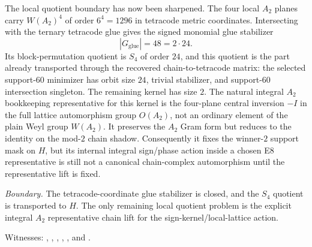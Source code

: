 %

\begin{result}
The local quotient boundary has now been sharpened.  The four local $A_2$ planes carry
$W(A_2)^4$ of order $6^4=1296$ in tetracode metric coordinates.  Intersecting with the
ternary tetracode glue gives the signed monomial glue stabilizer
\[
  |G_{\mathrm{glue}}|=48=2\cdot24.
\]
Its block-permutation quotient is $S_4$ of order $24$, and this quotient is the part already
transported through the recovered chain-to-tetracode matrix: the selected support-$60$ minimizer has
orbit size $24$, trivial stabilizer, and support-$60$ intersection singleton.  The remaining kernel has
size $2$.  The natural integral $A_2$ bookkeeping representative for this kernel is the four-plane
central inversion $-I$ in the full lattice automorphism group $O(A_2)$, not an ordinary element of the
plain Weyl group $W(A_2)$.  It preserves the $A_2$ Gram form but reduces to the identity on the mod-$2$
chain shadow.  Consequently it fixes the winner-$2$ support mask on $H$, but its internal integral
sign/phase action inside a chosen E8 representative is still not a canonical chain-complex automorphism
until the representative lift is fixed.

\emph{Boundary.}  The tetracode-coordinate glue stabilizer is closed, and the $S_4$ quotient is transported
to $H$.  The only remaining local quotient problem is the explicit integral $A_2$ representative chain lift
for the sign-kernel/local-lattice action.

Witnesses: ,
,
,
,
, and
.
\end{result}

